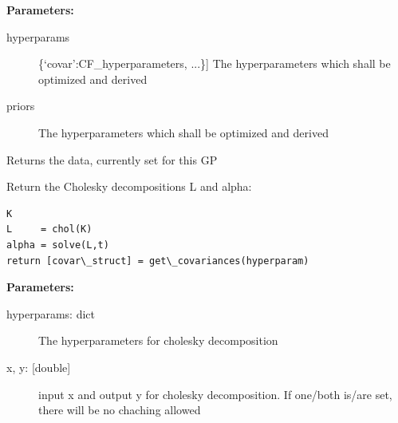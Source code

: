 \documentclass[letterpaper,10pt,english]{sphinxmanual}
\begin{document}
\begin{fulllineitems}
\begin{fulllineitems}
\textbf{Parameters:}
\begin{description}
\item[{hyperparams}] \leavevmode{[}\{`covar':CF\_hyperparameters, ...\}{]}
The hyperparameters which shall be optimized and derived

\item[{priors}] 
The hyperparameters which shall be optimized and derived

\end{description}

\end{fulllineitems}


\begin{fulllineitems}
\label{gp:pygp.gp.gp_base.GP.getData}
Returns the data, currently set for this GP

\end{fulllineitems}


\begin{fulllineitems}
\label{gp:pygp.gp.gp_base.GP.get_covariances}
Return the Cholesky decompositions L and alpha:

\begin{Verbatim}[commandchars=\\\{\}]
K 
L     = chol(K)
alpha = solve(L,t)
return [covar\_struct] = get\_covariances(hyperparam)
\end{Verbatim}

\textbf{Parameters:}
\begin{description}
\item[{hyperparams: dict}] \leavevmode
The hyperparameters for cholesky decomposition

\item[{x, y: {[}double{]}}] \leavevmode
input x and output y for cholesky decomposition.
If one/both is/are set, there will be no chaching allowed

\end{description}

\end{fulllineitems}



\end{fulllineitems}
\end{document}
